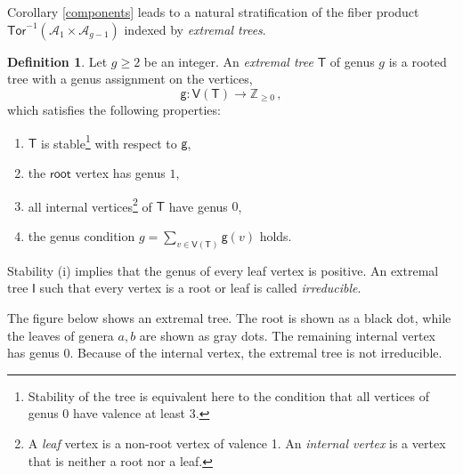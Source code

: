 \documentclass[11pt]{amsart}
\theoremstyle{definition}
\newtheorem{definition}[thm]{Definition}
\newcommand{\A}{\mathcal{A}}
\newcommand{\Tor}{\mathsf{Tor}}
\begin{document}
{Corollary \ref{components} leads to a natural stratification of the fiber product $\Tor^{-1}(\A_1\times \A_{g-1})$ indexed by {\it extremal trees}. 

\begin{definition}
    Let $g\geq 2$ be an integer. An {\it extremal tree} $\mathsf{T}$ of genus $g$ is a rooted tree 
    with a genus assignment on the vertices,
    $$\mathsf{g}: \mathsf{V}(\mathsf{T}) \rightarrow \mathbb{Z}_{\geq 0}\, ,$$
    which satisfies the following properties:
    \begin{enumerate}
    \item[(i)] $\mathsf{T}$ is 
    stable{\footnote{Stability of the tree is equivalent here to
    the condition that all vertices of genus 0 have valence at least 3.}}
    with respect to $\mathsf{g}$,
        \item [(ii)] the $\mathsf{root}$ vertex has genus $1$,
        \item [(iii)] all internal vertices{\footnote{A {\em leaf} vertex is a non-root vertex of valence 1.
        An {\em internal vertex} is a vertex
        that is neither a root nor a leaf.}} of $\mathsf{T}$ have genus $0$,
        \item [(iv)] the genus condition $g= \sum_{v\in \mathsf{V}(\mathsf{T})} \mathsf{g}(v)$ holds.
    \end{enumerate}
\end{definition}
\noindent Stability (i) implies that the genus of every
leaf vertex is positive. An extremal tree $\mathsf{I}$ such that every vertex is a root or leaf is called \emph{irreducible}. 

The figure below shows an extremal tree. The root is shown as a black dot, while the leaves of genera $a, b$ are shown as gray dots. The remaining internal vertex has genus $0$. Because of the internal vertex,  the extremal tree is not irreducible. 

\begin{center}
\end{center}



}
\end{document}
